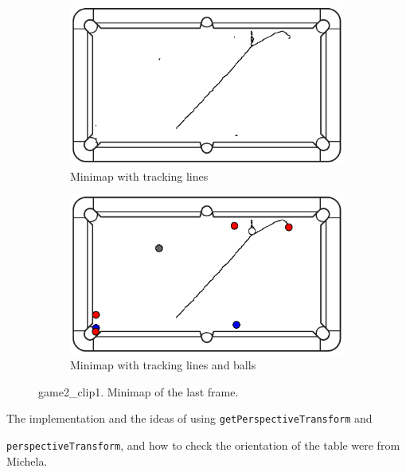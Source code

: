 \begin{figure}[H]
	\centering
	\begin{subfigure}[b]{0.48\textwidth}
		\centering
		\includegraphics[width=\textwidth]{images/Minimap/g2_c1minimap_with_track.jpg}
		\caption{Minimap with tracking lines}
		\label{fig:game2_clip1_tracking}
	\end{subfigure}
	\begin{subfigure}[b]{0.48\textwidth}
		\centering
		\includegraphics[width=\textwidth]{images/Minimap/g2_c1_minimap_with_balls.jpg}
		\caption{Minimap with tracking lines and balls}
		\label{fig:game2_clip1_balls}
	\end{subfigure}
	\caption{game2\_clip1. Minimap of the last frame.}
	\label{fig:game2_clip1_balls_and_tracking}
\end{figure}

The implementation and the ideas of using \texttt{getPerspectiveTransform} and

\noindent\texttt{perspectiveTransform}, and how to check the orientation of the table were from Michela.
